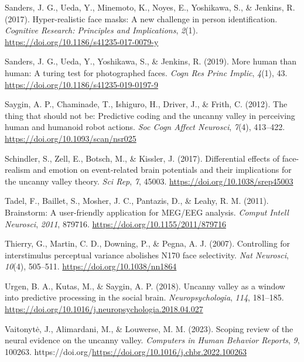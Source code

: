 \documentclass[
]{article}
\newlength{\cslhangindent}
\newenvironment{CSLReferences}[2] %
 {\begin{list}{}{%
  \setlength{\itemindent}{0pt}
  \setlength{\leftmargin}{0pt}
  \setlength{\parsep}{0pt}
  \ifodd #1
   \setlength{\leftmargin}{\cslhangindent}
   \setlength{\itemindent}{-1\cslhangindent}
  \fi
  \setlength{\itemsep}{#2\baselineskip}}}
 {\end{list}}
\begin{document}
\begin{CSLReferences}{1}{0}
Sanders, J. G., Ueda, Y., Minemoto, K., Noyes, E., Yoshikawa, S., \& Jenkins, R. (2017). Hyper-realistic face masks: A new challenge in person identification. \emph{Cognitive Research: Principles and Implications}, \emph{2}(1). \url{https://doi.org/10.1186/s41235-017-0079-y}

Sanders, J. G., Ueda, Y., Yoshikawa, S., \& Jenkins, R. (2019). More human than human: A turing test for photographed faces. \emph{Cogn Res Princ Implic}, \emph{4}(1), 43. \url{https://doi.org/10.1186/s41235-019-0197-9}

Saygin, A. P., Chaminade, T., Ishiguro, H., Driver, J., \& Frith, C. (2012). The thing that should not be: Predictive coding and the uncanny valley in perceiving human and humanoid robot actions. \emph{Soc Cogn Affect Neurosci}, \emph{7}(4), 413--422. \url{https://doi.org/10.1093/scan/nsr025}

Schindler, S., Zell, E., Botsch, M., \& Kissler, J. (2017). Differential effects of face-realism and emotion on event-related brain potentials and their implications for the uncanny valley theory. \emph{Sci Rep}, \emph{7}, 45003. \url{https://doi.org/10.1038/srep45003}

Tadel, F., Baillet, S., Mosher, J. C., Pantazis, D., \& Leahy, R. M. (2011). Brainstorm: A user-friendly application for MEG/EEG analysis. \emph{Comput Intell Neurosci}, \emph{2011}, 879716. \url{https://doi.org/10.1155/2011/879716}

Thierry, G., Martin, C. D., Downing, P., \& Pegna, A. J. (2007). Controlling for interstimulus perceptual variance abolishes N170 face selectivity. \emph{Nat Neurosci}, \emph{10}(4), 505--511. \url{https://doi.org/10.1038/nn1864}

Urgen, B. A., Kutas, M., \& Saygin, A. P. (2018). Uncanny valley as a window into predictive processing in the social brain. \emph{Neuropsychologia}, \emph{114}, 181--185. \url{https://doi.org/10.1016/j.neuropsychologia.2018.04.027}

Vaitonytė, J., Alimardani, M., \& Louwerse, M. M. (2023). Scoping review of the neural evidence on the uncanny valley. \emph{Computers in Human Behavior Reports}, \emph{9}, 100263. https://doi.org/\url{https://doi.org/10.1016/j.chbr.2022.100263}

\end{CSLReferences}
\end{document}
